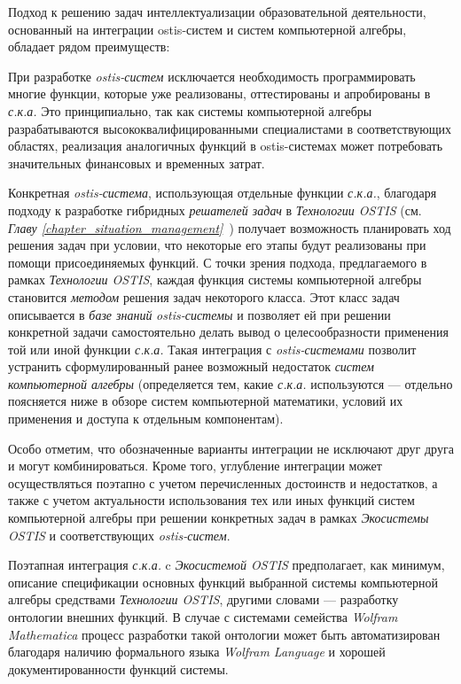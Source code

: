 Подход к решению задач интеллектуализации образовательной деятельности, основанный на интеграции ostis-систем и систем компьютерной алгебры, обладает рядом преимуществ:
\begin{textitemize}
	\item При разработке \textit{ostis-систем} исключается необходимость программировать многие функции, которые уже реализованы, оттестированы и апробированы в \textit{с.к.а.} Это принципиально, так как системы компьютерной алгебры разрабатываются высококвалифицированными специалистами в соответствующих областях, реализация аналогичных функций в ostis-системах может потребовать значительных финансовых и временных затрат.
	\item Конкретная \textit{ostis-система}, использующая отдельные функции \textit{с.к.а.}, благодаря подходу к разработке гибридных \textit{решателей задач} в \textit{Технологии OSTIS} (см. \textit{Главу \ref{chapter_situation_management}~}) получает возможность  планировать ход решения задач при условии, что некоторые его этапы будут реализованы при помощи присоединяемых функций. С точки зрения подхода, предлагаемого в рамках \textit{Технологии OSTIS}, каждая функция системы компьютерной алгебры становится \textit{методом} решения задач некоторого класса. Этот класс задач описывается в \textit{базе знаний} \textit{ostis-системы} и позволяет ей при решении конкретной задачи самостоятельно делать вывод о целесообразности применения той или иной функции \textit{с.к.а.} Такая интеграция с \textit{ostis-системами} позволит устранить сформулированный ранее возможный недостаток \textit{систем компьютерной алгебры} (определяется тем, какие \textit{с.к.а.} используются --- отдельно поясняется ниже в обзоре систем компьютерной математики, условий их применения и доступа к отдельным компонентам).
\end{textitemize}

Особо отметим, что обозначенные варианты интеграции не исключают друг друга и могут комбинироваться. Кроме того, углубление интеграции может осуществляться поэтапно с учетом перечисленных достоинств и недостатков, а также с учетом актуальности использования тех или иных функций систем компьютерной алгебры при решении конкретных задач в рамках \textit{Экосистемы OSTIS} и соответствующих \textit{ostis-систем}.

Поэтапная интеграция \textit{с.к.а.} c \textit{Экосистемой OSTIS} предполагает, как минимум, описание спецификации основных функций выбранной системы компьютерной алгебры средствами \textit{Технологии OSTIS}, другими словами --- разработку онтологии внешних функций. В случае с системами семейства \textit{Wolfram Mathematica} процесс разработки такой онтологии может быть автоматизирован благодаря наличию формального языка \textit{Wolfram Language} и хорошей документированности функций системы.

